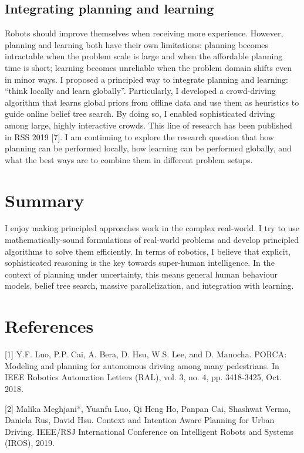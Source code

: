 \documentclass{article}
\begin{document}
\subsection*{Integrating planning and learning} Robots should improve themselves when receiving more experience. However, planning and learning both have their own limitations: planning becomes intractable when the problem scale is large and when the affordable planning time is short; learning becomes unreliable when the problem domain shifts even in minor ways. I proposed a principled way to integrate planning and learning: “think locally and learn globally”. Particularly, I developed a crowd-driving algorithm that learns global priors from offline data and use them as heuristics to guide online belief tree search. By doing so, I enabled sophisticated driving among large, highly interactive crowds. This line of research has been published in RSS 2019 [7]. I am continuing to explore the research question that how planning can be performed locally, how learning can be performed globally, and what the best ways are to combine them in different problem setups.

\section*{Summary}
I enjoy making principled approaches work in the complex real-world. I try to use mathematically-sound formulations of real-world problems and develop principled algorithms to solve them efficiently. In terms of robotics, I believe that explicit, sophisticated reasoning is the key towards super-human intelligence. In the context of planning under uncertainty, this means general human behaviour models, belief tree search, massive parallelization, and integration with learning.

\section*{References}
\small

[1] Y.F. Luo, P.P. Cai, A. Bera, D. Hsu, W.S. Lee, and D. Manocha. PORCA: Modeling and planning for autonomous driving among many pedestrians. In IEEE Robotics Automation Letters (RAL), vol. 3, no. 4, pp. 3418-3425, Oct. 2018. 

[2] Malika Meghjani*, Yuanfu Luo, Qi Heng Ho, Panpan Cai, Shashwat Verma, Daniela Rus, David Hsu. Context and Intention Aware Planning for Urban Driving. IEEE/RSJ International Conference on Intelligent Robots and Systems (IROS), 2019. 
\end{document}
